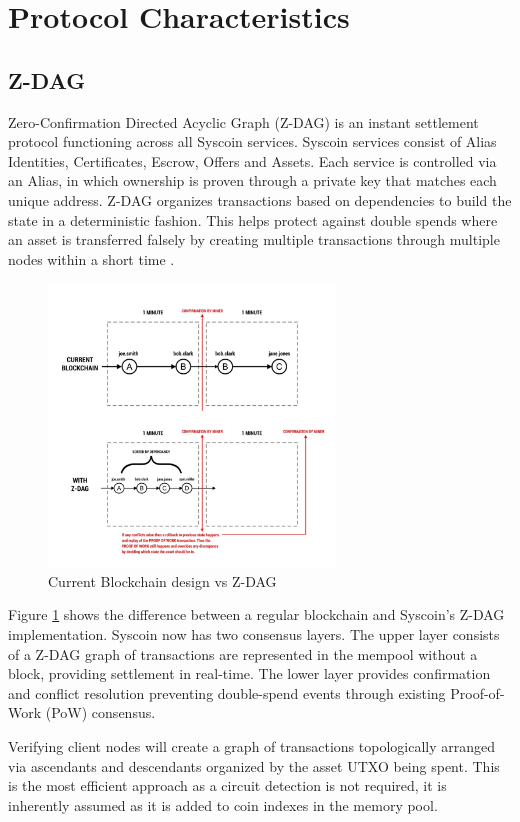 \documentclass[peerreview]{ieeesyscoin}
\begin{document}
\section{Protocol Characteristics}
\label{sec:protocol}

\subsection{Z-DAG}
Zero-Confirmation Directed Acyclic Graph (Z-DAG) is an instant settlement protocol functioning across all Syscoin services. Syscoin services consist of Alias Identities, Certificates, Escrow, Offers and Assets. Each service is controlled via an Alias, in which ownership is proven through a private key that matches each
unique address. Z-DAG organizes transactions based on dependencies to build the state in a deterministic fashion. This helps protect against double spends where an asset is transferred falsely by creating multiple transactions through multiple nodes within a short time \cite{Sida18}.

\begin{figure}[h!]
\includegraphics[width=3in]{img/current_vs_zdag.png}
\caption{Current Blockchain design vs Z-DAG} 
\label{fig:current_vs_zdag}
\end{figure} 

Figure \ref{fig:current_vs_zdag}  shows the difference between a regular blockchain and Syscoin’s Z-DAG implementation. Syscoin now has two consensus layers. The upper layer consists of a Z-DAG graph of transactions are represented in the mempool without a block, providing settlement in real-time. The lower layer provides confirmation and conflict resolution preventing double-spend events through existing Proof-of-Work (PoW) consensus.

Verifying client nodes will create a graph of transactions topologically arranged via ascendants and descendants organized by the asset UTXO being spent. This is the most efficient approach as a circuit detection is not required, it is inherently assumed as it is added to coin indexes in the memory pool.
\end{document}
